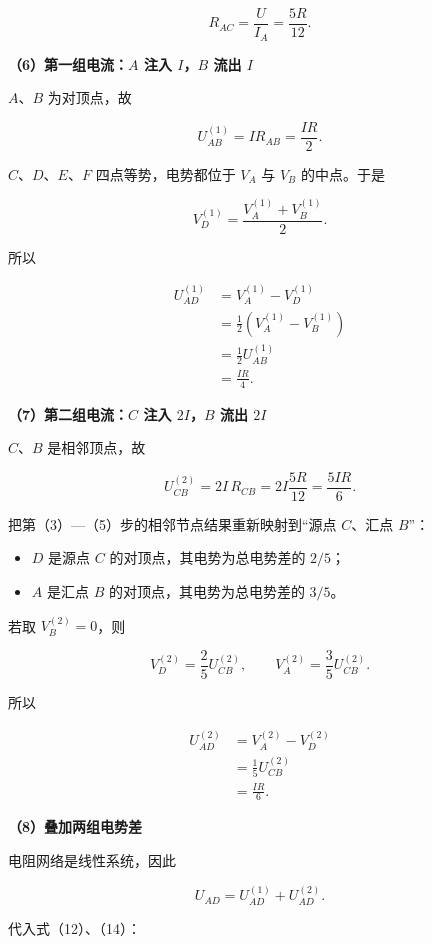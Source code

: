 \documentclass[12pt,a4paper,UTF8]{ctexart}
\newcommand{\tightlist}{\setlength{\itemsep}{0pt}\setlength{\parskip}{0pt}}
\begin{document}
\[
\boxed{
R_{AC}=\frac{U}{I_A}=\frac{5R}{12}
}.
\tag{10}
\]

\textbf{（6）第一组电流：\(A\) 注入 \(I\)，\(B\) 流出 \(I\)}

\(A\)、\(B\) 为对顶点，故

\[
U_{AB}^{(1)}=IR_{AB}=\frac{IR}{2}.
\tag{11}
\]

\(C\)、\(D\)、\(E\)、\(F\) 四点等势，电势都位于 \(V_A\) 与 \(V_B\)
的中点。于是

\[
V_D^{(1)}=\frac{V_A^{(1)}+V_B^{(1)}}2.
\]

所以

\[
\begin{aligned}
U_{AD}^{(1)}
&=V_A^{(1)}-V_D^{(1)}\\
&=\frac12\left(V_A^{(1)}-V_B^{(1)}\right)\\
&=\frac12U_{AB}^{(1)}\\
&=\frac{IR}{4}.
\end{aligned}
\tag{12}
\]

\textbf{（7）第二组电流：\(C\) 注入 \(2I\)，\(B\) 流出 \(2I\)}

\(C\)、\(B\) 是相邻顶点，故

\[
U_{CB}^{(2)}
=2I\,R_{CB}
=2I\frac{5R}{12}
=\frac{5IR}{6}.
\tag{13}
\]

把第（3）---（5）步的相邻节点结果重新映射到``源点 \(C\)、汇点 \(B\)''：

\begin{itemize}
\tightlist
\item
  \(D\) 是源点 \(C\) 的对顶点，其电势为总电势差的 \(2/5\)；
\item
  \(A\) 是汇点 \(B\) 的对顶点，其电势为总电势差的 \(3/5\)。
\end{itemize}

若取 \(V_B^{(2)}=0\)，则

\[
V_D^{(2)}=\frac25U_{CB}^{(2)},
\qquad
V_A^{(2)}=\frac35U_{CB}^{(2)}.
\]

所以

\[
\begin{aligned}
U_{AD}^{(2)}
&=V_A^{(2)}-V_D^{(2)}\\
&=\frac15U_{CB}^{(2)}\\
&=\frac{IR}{6}.
\end{aligned}
\tag{14}
\]

\textbf{（8）叠加两组电势差}

电阻网络是线性系统，因此

\[
U_{AD}=U_{AD}^{(1)}+U_{AD}^{(2)}.
\]

代入式（12）、（14）：
\end{document}
